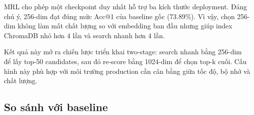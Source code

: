 \documentclass[../DoAn.tex]{subfiles}
\begin{document}
\begin{table}[H]
    \centering
    \caption{Kết quả MRL theo kích thước embedding}
    \label{tab:embedding-dimensions}
    {\small
    \setlength{\tabcolsep}{4pt}
    }
\end{table}

MRL cho phép một checkpoint duy nhất hỗ trợ ba kích thước deployment. Đáng chú ý, 256-dim đạt đúng mức Acc@1 của baseline gốc (73.89\%). Vì vậy, chọn 256-dim không làm mất chất lượng so với embedding ban đầu nhưng giúp index ChromaDB nhỏ hơn 4 lần và search nhanh hơn 4 lần.

Kết quả này mở ra chiến lược triển khai two-stage: search nhanh bằng 256-dim để lấy top-50 candidates, sau đó re-score bằng 1024-dim để chọn top-k cuối. Cấu hình này phù hợp với môi trường production cần cân bằng giữa tốc độ, bộ nhớ và chất lượng.

\subsection{So sánh với baseline}
\label{subsection:5.3.3}
\end{document}

